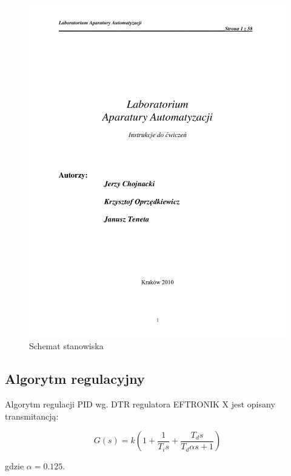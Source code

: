 \documentclass[12pt]{article}
\begin{document}
\begin{figure}[!htb]
	\begin{center}
		\includegraphics[page=19,width=17cm,trim=2.5cm 4.8cm 3cm 17cm,clip]
		{../res/img/schemat_stanowiska.pdf}
	\end{center}
	\caption{Schemat stanowiska}
\end{figure}

\subsection{Algorytm regulacyjny}

Algorytm regulacji PID wg. DTR regulatora EFTRONIK X jest opisany transmitancją:

\begin{equation}
	G(s)=k\left(1+\frac{1}{T_is}+\frac{T_ds}{T_d\alpha s+1}\right)
\end{equation}

gdzie $\alpha=0.125$.

\newpage
\end{document}
